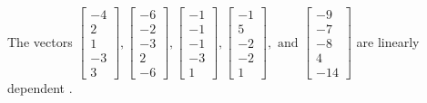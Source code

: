 \begin{exercise}
\begin{exerciseStatement}
  \end{exerciseStatement}
  \begin{exerciseAnswer}
   The vectors \(\left[\begin{array}{r}
-4 \\
2 \\
1 \\
-3 \\
3
\end{array}\right] , \left[\begin{array}{r}
-6 \\
-2 \\
-3 \\
2 \\
-6
\end{array}\right] , \left[\begin{array}{r}
-1 \\
-1 \\
-1 \\
-3 \\
1
\end{array}\right] , \left[\begin{array}{r}
-1 \\
5 \\
-2 \\
-2 \\
1
\end{array}\right] , \text{ and } \left[\begin{array}{r}
-9 \\
-7 \\
-8 \\
4 \\
-14
\end{array}\right]\) are 
  	 linearly dependent  .
  


  \end{exerciseAnswer}
\end{exercise}